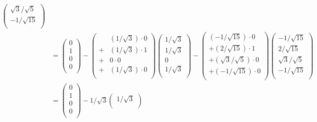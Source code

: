 \documentclass[dvipdfmx]{jsarticle}
\begin{document}
\begin{align*}
\begin{pmatrix}
  {\sqrt{3}}/{\sqrt{5}} \\
   - {1}/{\sqrt{15}} \\
\end{pmatrix}\\
&= \begin{pmatrix}
  0 \\
  1 \\
  0 \\
  0 \\
\end{pmatrix} - \begin{pmatrix}
  \  & \left( {1}/{\sqrt{3}} \right) \cdot 0 \\
   + & \left( {1}/{\sqrt{3}} \right) \cdot 1 \\
   + & 0 \cdot 0 \\
   + & \left( {1}/{\sqrt{3}} \right) \cdot 0 \\
\end{pmatrix}\begin{pmatrix}
  {1}/{\sqrt{3}} \\
  {1}/{\sqrt{3}} \\
  0 \\
  {1}/{\sqrt{3}} \\
\end{pmatrix} - \begin{pmatrix}
  \left( - {1}/{\sqrt{15}} \right) \cdot 0 \\
   + \left( {2}/{\sqrt{15}} \right) \cdot 1 \\
   + \left( {\sqrt{3}}/{\sqrt{5}} \right) \cdot 0 \\
   + \left( - {1}/{\sqrt{15}} \right) \cdot 0 \\
\end{pmatrix}\begin{pmatrix}
   - {1}/{\sqrt{15}} \\
  {2}/{\sqrt{15}} \\
  {\sqrt{3}}/{\sqrt{5}} \\
   - {1}/{\sqrt{15}} \\
\end{pmatrix}\\
&= \begin{pmatrix}
  0 \\
  1 \\
  0 \\
  0 \\
\end{pmatrix} - {1}/{\sqrt{3}}\begin{pmatrix}
  {1}/{\sqrt{3}} \\

\end{pmatrix}
\end{align*}
\end{document}
